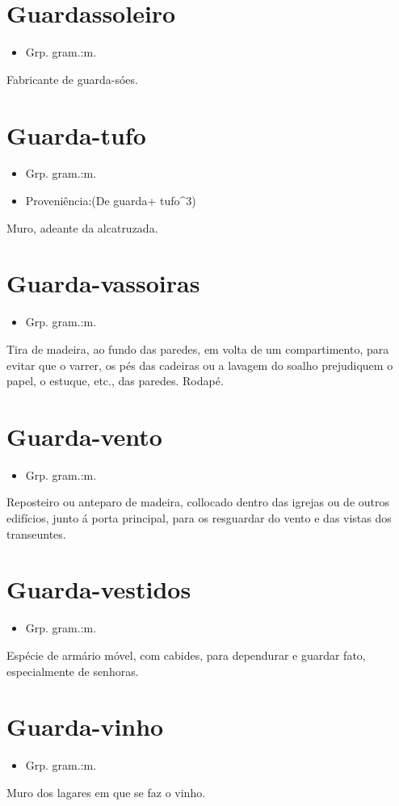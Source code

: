 \section{Guardassoleiro}
\begin{itemize}
\item {Grp. gram.:m.}
\end{itemize}
Fabricante de guarda-sóes.
\section{Guarda-tufo}
\begin{itemize}
\item {Grp. gram.:m.}
\end{itemize}
\begin{itemize}
\item {Proveniência:(De \textunderscore guarda\textunderscore  + \textunderscore tufo\textunderscore ^3)}
\end{itemize}
Muro, adeante da alcatruzada.
\section{Guarda-vassoiras}
\begin{itemize}
\item {Grp. gram.:m.}
\end{itemize}
Tira de madeira, ao fundo das paredes, em volta de um compartimento, para evitar que o varrer, os pés das cadeiras ou a lavagem do soalho prejudiquem o papel, o estuque, etc., das paredes.
Rodapé.
\section{Guarda-vento}
\begin{itemize}
\item {Grp. gram.:m.}
\end{itemize}
Reposteiro ou anteparo de madeira, collocado dentro das igrejas ou de outros edifícios, junto á porta principal, para os resguardar do vento e das vistas dos transeuntes.
\section{Guarda-vestidos}
\begin{itemize}
\item {Grp. gram.:m.}
\end{itemize}
Espécie de armário móvel, com cabides, para dependurar e guardar fato, especialmente de senhoras.
\section{Guarda-vinho}
\begin{itemize}
\item {Grp. gram.:m.}
\end{itemize}
Muro dos lagares em que se faz o vinho.
